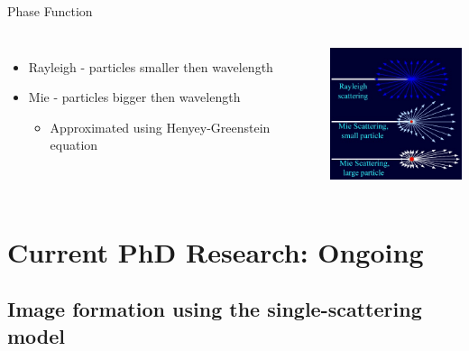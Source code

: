 \documentclass[compress,red,12pt]{beamer}
\begin{document}
\begin{frame}[T]{Phase Function}
  \begin{columns}[T]
    \begin{itemize}
    \item Rayleigh - particles smaller then wavelength
    \item Mie - particles bigger then wavelength
      \begin{itemize}
      \item Approximated using Henyey-Greenstein equation
      \end{itemize}
    \end{itemize}
    \centering
    \includegraphics[height=4cm]{images/Mie_Rayleigh.jpg}
  \end{columns}
\end{frame}


\section{Current PhD Research: Ongoing}


\subsection{Image formation using the single-scattering model}
\end{document}
